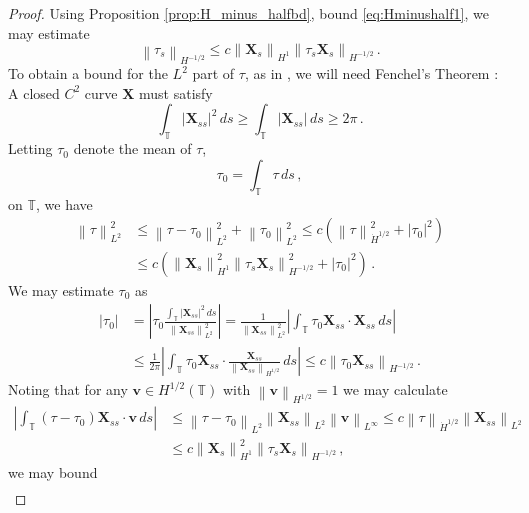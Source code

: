 \documentclass[11pt,reqno]{amsart}
\newcommand{\T}{\mathbb{T}}
\newcommand{\X}{\bm{X}}
\newcommand{\bv}{\bm{v}}
\newcommand{\abs}[1]{\left\lvert #1 \right\rvert}
\newcommand{\norm}[1]{\left\lVert #1 \right\rVert}
\numberwithin{equation}{section}
\theoremstyle{definition}
\begin{document}
\begin{proof}
Using Proposition \ref{prop:H_minus_halfbd}, bound \eqref{eq:Hminushalf1}, we may estimate
\begin{equation}
  \norm{\tau_s}_{H^{-1/2}}\le c\norm{\X_s}_{H^1}\norm{\tau_s\X_s}_{H^{-1/2}}\,.
\end{equation}
To obtain a bound for the $L^2$ part of $\tau$, as in \cite{albritton2025rods}, we will need Fenchel's Theorem \cite{fenchel1951differential}: A closed $C^2$ curve $\X$ must satisfy
\begin{equation}\label{eq:fenchel}
  \int_\T\abs{\X_{ss}}^2\,ds \ge \int_\T \abs{\X_{ss}}\,ds\ge 2\pi\,.
\end{equation} 
Letting $\tau_0$ denote the mean of $\tau$, 
\begin{equation}
  \tau_0 = \int_\T\tau\,ds\,,
\end{equation}
on $\T$, we have 
\begin{equation}
\begin{aligned}
  \norm{\tau}_{L^2}^2&\le \norm{\tau-\tau_0}_{L^2}^2+\norm{\tau_0}_{L^2}^2 \le c(\norm{\tau}_{\dot H^{1/2}}^2 + \abs{\tau_0}^2) \\
  &\le c(\norm{\X_s}_{H^1}^2\norm{\tau_s\X_s}_{H^{-1/2}}^2+\abs{\tau_0}^2)\,.
\end{aligned}
\end{equation}
We may estimate $\tau_0$ as 
\begin{equation}
\begin{aligned}
  \abs{\tau_0} &= \abs{\tau_0\frac{\int_\T\abs{\X_{ss}}^2\,ds}{\norm{\X_{ss}}_{L^2}^2}} = \frac{1}{\norm{\X_{ss}}_{L^2}^2}\abs{\int_\T \tau_0 \X_{ss}\cdot\X_{ss}\,ds} \\
  &\le \frac{1}{2\pi}\abs{\int_\T \tau_0\X_{ss}\cdot\frac{\X_{ss}}{\norm{\X_{ss}}_{H^{1/2}}}\,ds} \le c\norm{\tau_0\X_{ss}}_{H^{-1/2}}\,.
\end{aligned}
\end{equation}
Noting that for any $\bv\in H^{1/2}(\T)$ with $\norm{\bv}_{H^{1/2}}=1$ we may calculate
\begin{equation}
\begin{aligned}
  \abs{\int_\T(\tau-\tau_0)\X_{ss}\cdot\bv\,ds} &\le \norm{\tau-\tau_0}_{L^2}\norm{\X_{ss}}_{L^2}\norm{\bv}_{L^\infty}
  \le c\norm{\tau}_{\dot H^{1/2}}\norm{\X_{ss}}_{L^2}\\
  &\le c\norm{\X_s}_{H^1}^2\norm{\tau_s\X_s}_{H^{-1/2}}\,,
\end{aligned}
\end{equation}
we may bound
\begin{equation}
\begin{aligned}

\end{aligned}
\end{equation}
\end{proof}
\end{document}
